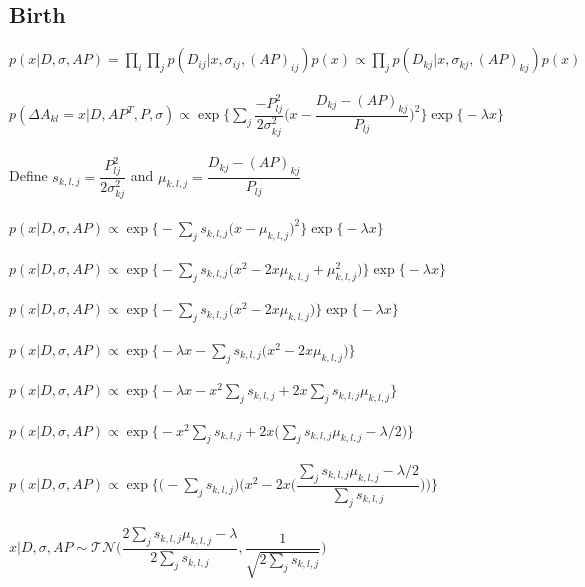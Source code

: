 \documentclass[]{article}
\begin{document}
\subsection{Birth}

$p(x|D,\sigma,AP) = \prod_i \prod_j p(D_{ij}|x,\sigma_{ij},(AP)_{ij})p(x) \propto \prod_j p(D_{kj}|x,\sigma_{kj},(AP)_{kj})p(x)$\\
\\
$p(\Delta A_{kl} = x|D,AP^T,P,\sigma) \propto \exp\biggr\{\sum_j\dfrac{-P_{lj}^2}{2\sigma_{kj}^2}\biggr(x - \dfrac{D_{kj} - (AP)_{kj}}{P_{lj}}\biggr)^2\biggr\}\exp\biggr\{-\lambda x\biggr\}$\\
\\
Define $s_{k,l,j}=\dfrac{P_{lj}^2}{2\sigma_{kj}^2}$ and $\mu_{k,l,j}=\dfrac{D_{kj} - (AP)_{kj}}{P_{lj}}$\\
\\
$p(x|D,\sigma,AP) \propto \exp\biggr\{-\sum_j s_{k,l,j}\biggr(x - \mu_{k,l,j}\biggr)^2\biggr\}\exp\biggr\{-\lambda x\biggr\}$\\
\\
$p(x|D,\sigma,AP) \propto \exp\biggr\{-\sum_j s_{k,l,j}\biggr(x^2 - 2x\mu_{k,l,j} + \mu_{k,l,j}^2\biggr)\biggr\}\exp\biggr\{-\lambda x\biggr\}$\\
\\
$p(x|D,\sigma,AP) \propto \exp\biggr\{-\sum_j s_{k,l,j}\biggr(x^2 - 2x\mu_{k,l,j}\biggr)\biggr\}\exp\biggr\{-\lambda x\biggr\}$\\
\\
$p(x|D,\sigma,AP) \propto \exp\biggr\{-\lambda x - \sum_j s_{k,l,j}\biggr(x^2 - 2x\mu_{k,l,j}\biggr)\biggr\}$\\
\\
$p(x|D,\sigma,AP) \propto \exp\biggr\{-\lambda x - x^2\sum_j s_{k,l,j} + 2x\sum_j s_{k,l,j}\mu_{k,l,j}\biggr\}$\\
\\
$p(x|D,\sigma,AP) \propto \exp\biggr\{-x^2\sum_j s_{k,l,j} + 2x\biggr(\sum_j s_{k,l,j}\mu_{k,l,j} - \lambda/2\biggr)\biggr\}$\\
\\
$p(x|D,\sigma,AP) \propto \exp\biggr\{\biggr(-\sum_j s_{k,l,j}\biggr) \biggr(x^2 - 2x\biggr(\dfrac{\sum_j s_{k,l,j}\mu_{k,l,j} - \lambda/2}{\sum_j s_{k,l,j}}\biggr)\biggr)\biggr\}$\\
\\
$x|D,\sigma,AP \sim \mathcal{TN}\biggr(\dfrac{2\sum_j s_{k,l,j}\mu_{k,l,j} - \lambda}{2\sum_j s_{k,l,j}}, \dfrac{1}{\sqrt{2\sum_j s_{k,l,j}}}\biggr)$\\
\end{document}
